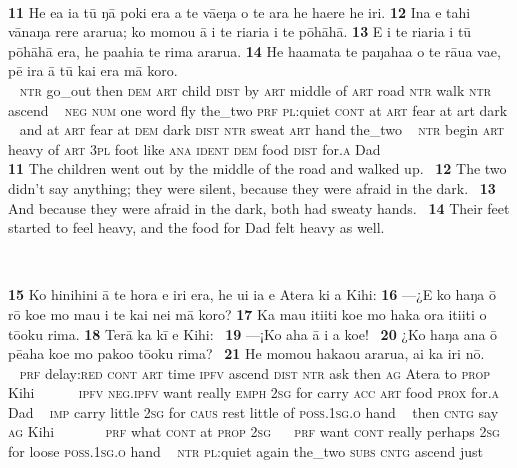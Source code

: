 ~

\bigskip\gll
\textbf{\textup{11}} He e{\ꞌ}a ia tū ŋā poki era a te vāeŋa o te ara he ha{\ꞌ}ere he iri. \textbf{\textup{12}} {\ꞌ}Ina e tahi vānaŋa rere ararua; ko momou {\ꞌ}ā {\ꞌ}i te ri{\ꞌ}ari{\ꞌ}a {\ꞌ}i te pōhāhā. \textbf{\textup{13}} {\ꞌ}E {\ꞌ}i te ri{\ꞌ}ari{\ꞌ}a {\ꞌ}i tū pōhāhā era, he pa{\ꞌ}ahia te rima ararua. \textbf{\textup{14}} He ha{\ꞌ}amata te paŋaha{\ꞌ}a o te rāua va{\ꞌ}e, pē ira {\ꞌ}ā tū kai era mā koro.\\
~ \textsc{ntr} go\_out then \textsc{dem} \textsc{art} child \textsc{dist} by \textsc{art} middle of \textsc{art} road \textsc{ntr} walk \textsc{ntr} ascend ~ \textsc{neg} \textsc{num} one word fly the\_two \textsc{prf} \textsc{pl}:quiet \textsc{cont} at \textsc{art} fear at art dark  ~ and at \textsc{art} fear at \textsc{dem} dark \textsc{dist} \textsc{ntr} sweat \textsc{art} hand the\_two  ~ \textsc{ntr} begin \textsc{art} heavy of \textsc{art} \textsc{3pl} foot like \textsc{ana} \textsc{ident} \textsc{dem} food \textsc{dist} for\textsc{.a} Dad\\

\medskip\glt
\textbf{\textup{11}} The children went out by the middle of the road and walked up. ~\textbf{\textup{12}} The two didn’t say anything; they were silent, because they were afraid in the dark. ~\textbf{\textup{13}} And because they were afraid in the dark, both had sweaty hands. ~\textbf{\textup{14}} Their feet started to feel heavy, and the food for Dad felt heavy as well.


~

\bigskip\gll
\textbf{\textup{15}} Ko hinihini {\ꞌ}ā te hora e iri era, he {\ꞌ}ui ia e {\ꞌ}Atera ki a Kihi: \textbf{\textup{16}} —¿E ko haŋa {\ꞌ}ō rō koe mo ma{\ꞌ}u i te kai nei mā koro? \textbf{\textup{17}} Ka ma{\ꞌ}u {\ꞌ}iti{\ꞌ}iti koe mo haka ora {\ꞌ}iti{\ꞌ}iti o tō{\ꞌ}oku rima. \textbf{\textup{18}} Terā ka kī e Kihi: ~\textbf{\textup{19}} ––¡Ko aha {\ꞌ}ā i a koe! ~\textbf{\textup{20}} ¿Ko haŋa {\ꞌ}ana {\ꞌ}ō pēaha koe mo pako{\ꞌ}o tō{\ꞌ}oku rima? ~\textbf{\textup{21}} He momou haka{\ꞌ}ou ararua, {\ꞌ}ai ka iri nō.\\
~ \textsc{prf} delay:\textsc{red} \textsc{cont} \textsc{art} time \textsc{ipfv} ascend \textsc{dist} \textsc{ntr} ask then \textsc{ag} Atera to \textsc{prop} Kihi ~ ~~~~\textsc{ipfv} \textsc{neg.ipfv} want really \textsc{emph} \textsc{2sg} for carry \textsc{acc} \textsc{art} food \textsc{prox} for\textsc{.a} Dad  ~ \textsc{imp} carry little \textsc{2sg} for \textsc{caus} rest little of \textsc{poss.1sg.o} hand ~ then \textsc{cntg} say \textsc{ag} Kihi ~ ~~~~~\textsc{prf} what \textsc{cont} at \textsc{prop} \textsc{2sg} ~ ~\textsc{prf} want \textsc{cont} really perhaps \textsc{2sg} for loose \textsc{poss.1sg.o} hand ~ \textsc{ntr} \textsc{pl}:quiet again the\_two \textsc{subs} \textsc{cntg} ascend just\\

